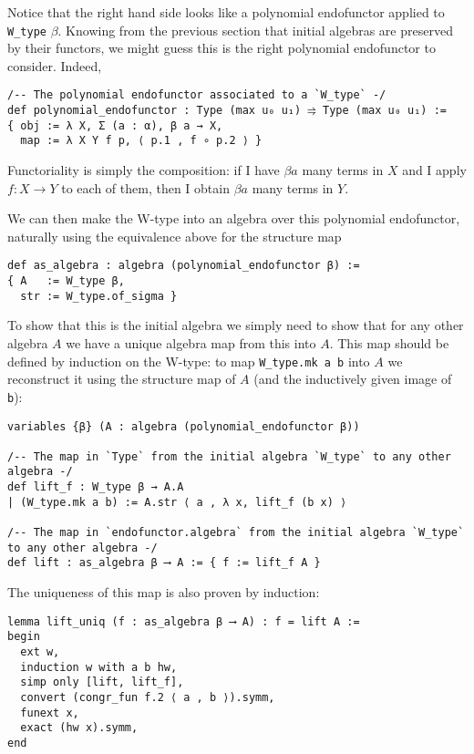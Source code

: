 \documentclass{article}
\newcommand{\be}{\beta}
\newcommand{\<}{\langle}
\renewcommand{\>}{\rangle}
\theoremstyle{definitionstyle}
\theoremstyle{exercisestyle}
\theoremstyle{remarkstyle}
\begin{document}
Notice that the right hand side looks like a polynomial endofunctor
applied to \texttt{W\_type} $\be$.
Knowing from the previous section that initial algebras are
preserved by their functors, we might guess this is the right
polynomial endofunctor to consider. Indeed,

\begin{lstlisting}
/-- The polynomial endofunctor associated to a `W_type` -/
def polynomial_endofunctor : Type (max u₀ u₁) ⥤ Type (max u₀ u₁) :=
{ obj := λ X, Σ (a : α), β a → X,
  map := λ X Y f p, ⟨ p.1 , f ∘ p.2 ⟩ } \end{lstlisting}

Functoriality is simply the composition:
if I have $\be a$ many terms in $X$ and I apply $f : X \to Y$ to each of them,
then I obtain $\be a$ many terms in $Y$.

We can then make the W-type into an algebra over this polynomial endofunctor,
naturally using the equivalence above for the structure map
\begin{lstlisting}
def as_algebra : algebra (polynomial_endofunctor β) :=
{ A   := W_type β,
  str := W_type.of_sigma } \end{lstlisting}

To show that this is the initial algebra we simply need to show that
for any other algebra $A$ we have a unique algebra map from this into $A$.
This map should be defined by induction on the W-type:
to map \texttt{W\_type.mk a b} into $A$ we reconstruct it using the
structure map of $A$ (and the inductively given image of \texttt{b}):

\begin{lstlisting}
variables {β} (A : algebra (polynomial_endofunctor β))

/-- The map in `Type` from the initial algebra `W_type` to any other algebra -/
def lift_f : W_type β → A.A
| (W_type.mk a b) := A.str ⟨ a , λ x, lift_f (b x) ⟩

/-- The map in `endofunctor.algebra` from the initial algebra `W_type` to any other algebra -/
def lift : as_algebra β ⟶ A := { f := lift_f A } \end{lstlisting}

The uniqueness of this map is also proven by induction:

\begin{lstlisting}
lemma lift_uniq (f : as_algebra β ⟶ A) : f = lift A :=
begin
  ext w,
  induction w with a b hw,
  simp only [lift, lift_f],
  convert (congr_fun f.2 ⟨ a , b ⟩).symm,
  funext x,
  exact (hw x).symm,
end \end{lstlisting}
\end{document}
